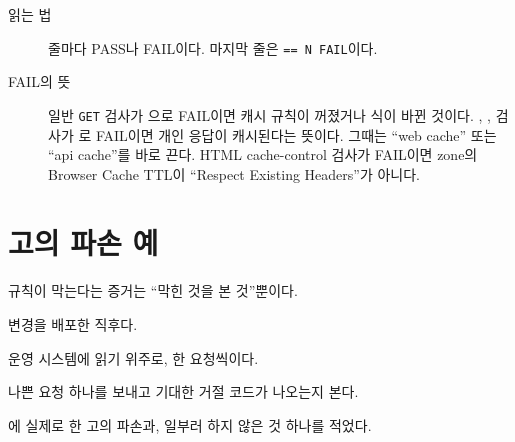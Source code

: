 \begin{description}
  \item[읽는 법] 줄마다 PASS나 FAIL이다. 마지막 줄은 \texttt{== N FAIL}이다.
  \item[FAIL의 뜻] 일반 \texttt{GET} 검사가 으로 FAIL이면 캐시 규칙이 꺼졌거나 식이 바뀐 것이다.
    , ,  검사가 로 FAIL이면 개인 응답이 캐시된다는 뜻이다. 그때는 ``web cache'' 또는 ``api cache''를 바로 끈다.
    HTML cache-control 검사가 FAIL이면 zone의 Browser Cache TTL이 ``Respect Existing Headers''가 아니다.
\end{description}

\section{고의 파손 예}\label{sec:07-breakage-examples}

\begin{inbrief}
  \item[Why] 규칙이 막는다는 증거는 ``막힌 것을 본 것''뿐이다.
  \item[When] 변경을 배포한 직후다.
  \item[Where] 운영 시스템에 읽기 위주로, 한 요청씩이다.
  \item[How] 나쁜 요청 하나를 보내고 기대한 거절 코드가 나오는지 본다.
\end{inbrief}

에 실제로 한 고의 파손과, 일부러 하지 않은 것 하나를 적었다.

